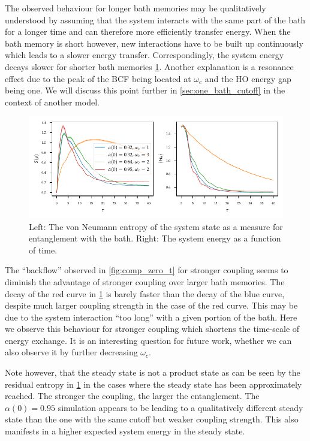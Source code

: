 The observed behaviour for longer bath memories may be qualitatively
understood by assuming that the system interacts with the same part of
the bath for a longer time and can therefore more efficiently transfer
energy. When the bath memory is short however, new interactions have
to be built up continuously which leads to a slower energy
transfer. Correspondingly, the system energy decays slower for shorter
bath memories \cref{fig:ho_zero_entropy}. Another explanation is a
resonance effect due to the peak of the BCF being located at \(ω_c\)
and the HO energy gap being one. We will discuss this point further in
\cref{sec:one_bath_cutoff} in the context of another model.

\begin{figure}[h]
  \centering
  \includegraphics{figs/analytic_comp/entropy_zero.pdf}
  \caption{\label{fig:ho_zero_entropy} Left: The von Neumann entropy
    of the system state as a measure for entanglement with the
    bath. Right: The system energy as a function of time.}
\end{figure}
The ``backflow'' observed in \cref{fig:comp_zero_t} for stronger
coupling seems to diminish the advantage of stronger coupling over
larger bath memories. The decay of the red curve in
\cref{fig:ho_zero_entropy} is barely faster than the decay of the blue
curve, despite much larger coupling strength in the case of the red
curve. This may be due to the system interaction ``too long'' with a
given portion of the bath. Here we observe this behaviour for stronger
coupling which shortens the time-scale of energy exchange. It is an
interesting question for future work, whether we can also observe it
by further decreasing \(ω_c\).

Note however, that the steady state is not a product state as can be
seen by the residual entropy in \cref{fig:ho_zero_entropy} in the
cases where the steady state has been approximately reached. The
stronger the coupling, the larger the entanglement. The \(α(0)=0.95\)
simulation appears to be leading to a qualitatively different steady
state than the one with the same cutoff but weaker coupling
strength. This also manifests in a higher expected system energy in
the steady state.

